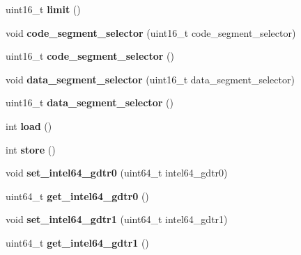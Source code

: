 \begin{DoxyCompactItemize}
\item 
\hypertarget{classintel64__gdtr_a9f926b9329486ffaae0b971c4b094880}{}uint16\+\_\+t {\bfseries limit} ()\label{classintel64__gdtr_a9f926b9329486ffaae0b971c4b094880}

\item 
\hypertarget{classintel64__gdtr_a0552ea7940cf37442ec75268f65b27e8}{}void {\bfseries code\+\_\+segment\+\_\+selector} (uint16\+\_\+t code\+\_\+segment\+\_\+selector)\label{classintel64__gdtr_a0552ea7940cf37442ec75268f65b27e8}

\item 
\hypertarget{classintel64__gdtr_a15c039357bb4a520e4537e5e1708ece3}{}uint16\+\_\+t {\bfseries code\+\_\+segment\+\_\+selector} ()\label{classintel64__gdtr_a15c039357bb4a520e4537e5e1708ece3}

\item 
\hypertarget{classintel64__gdtr_aee02575c697df7ed75a1b3e43686ff47}{}void {\bfseries data\+\_\+segment\+\_\+selector} (uint16\+\_\+t data\+\_\+segment\+\_\+selector)\label{classintel64__gdtr_aee02575c697df7ed75a1b3e43686ff47}

\item 
\hypertarget{classintel64__gdtr_a683fdd1a65594ee6a5f65ce4a6be0af1}{}uint16\+\_\+t {\bfseries data\+\_\+segment\+\_\+selector} ()\label{classintel64__gdtr_a683fdd1a65594ee6a5f65ce4a6be0af1}

\item 
\hypertarget{classintel64__gdtr_aef2bfbfbf21ab2d918e85afcbe1dd618}{}int {\bfseries load} ()\label{classintel64__gdtr_aef2bfbfbf21ab2d918e85afcbe1dd618}

\item 
\hypertarget{classintel64__gdtr_ac6f7e3ce4569fac4b164816a8cbc9382}{}int {\bfseries store} ()\label{classintel64__gdtr_ac6f7e3ce4569fac4b164816a8cbc9382}

\item 
\hypertarget{classintel64__gdtr_a0931019cb582a6925999c406aacd0f35}{}void {\bfseries set\+\_\+intel64\+\_\+gdtr0} (uint64\+\_\+t intel64\+\_\+gdtr0)\label{classintel64__gdtr_a0931019cb582a6925999c406aacd0f35}

\item 
\hypertarget{classintel64__gdtr_a9b6055730cbc1a9560b08f4d12035b24}{}uint64\+\_\+t {\bfseries get\+\_\+intel64\+\_\+gdtr0} ()\label{classintel64__gdtr_a9b6055730cbc1a9560b08f4d12035b24}

\item 
\hypertarget{classintel64__gdtr_a90d550149c25007a4d55bd7d769783ee}{}void {\bfseries set\+\_\+intel64\+\_\+gdtr1} (uint64\+\_\+t intel64\+\_\+gdtr1)\label{classintel64__gdtr_a90d550149c25007a4d55bd7d769783ee}

\item 
\hypertarget{classintel64__gdtr_a92c51dc778a145cda6353e3c905ca5e3}{}uint64\+\_\+t {\bfseries get\+\_\+intel64\+\_\+gdtr1} ()\label{classintel64__gdtr_a92c51dc778a145cda6353e3c905ca5e3}

\end{DoxyCompactItemize}


